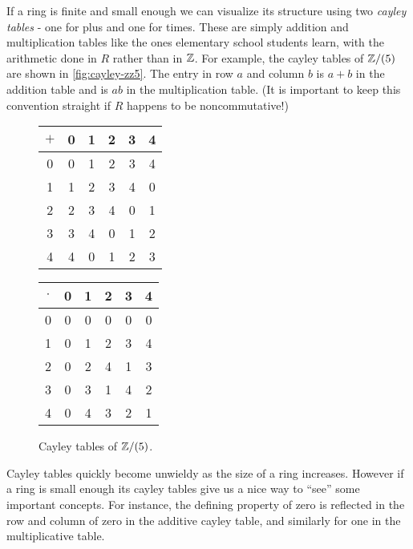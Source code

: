 If a ring is finite and small enough we can visualize its structure using two \emph{cayley tables} - one for plus and one for times.
These are simply addition and multiplication tables like the ones elementary school students learn, with the arithmetic done in \(R\) rather than in \(\mathbb{Z}\).
For example, the cayley tables of \(\mathbb{Z}/(5)\) are shown in \autoref{fig:cayley-zz5}.
The entry in row \(a\) and column \(b\) is \(a+b\) in the addition table and is \(ab\) in the multiplication table.
(It is important to keep this convention straight if \(R\) happens to be noncommutative!)
\begin{figure}[h!]
\begin{center}
\begin{tabular}{c|ccccc}
\(+\)
  & 0 & 1 & 2 & 3 & 4 \\ \hline
0 & 0 & 1 & 2 & 3 & 4 \\
1 & 1 & 2 & 3 & 4 & 0 \\
2 & 2 & 3 & 4 & 0 & 1 \\
3 & 3 & 4 & 0 & 1 & 2 \\
4 & 4 & 0 & 1 & 2 & 3
\end{tabular}
\quad\quad
\begin{tabular}{c|ccccc}
\(\cdot\)
  & 0 & 1 & 2 & 3 & 4 \\ \hline
0 & 0 & 0 & 0 & 0 & 0 \\
1 & 0 & 1 & 2 & 3 & 4 \\
2 & 0 & 2 & 4 & 1 & 3 \\
3 & 0 & 3 & 1 & 4 & 2 \\
4 & 0 & 4 & 3 & 2 & 1
\end{tabular}
\caption{\label{fig:cayley-zz5} Cayley tables of \(\mathbb{Z}/(5)\).}
\end{center}
\end{figure}
Cayley tables quickly become unwieldy as the size of a ring increases.
However if a ring is small enough its cayley tables give us a nice way to ``see'' some important concepts.
For instance, the defining property of zero is reflected in the row and column of zero in the additive cayley table, and similarly for one in the multiplicative table.
